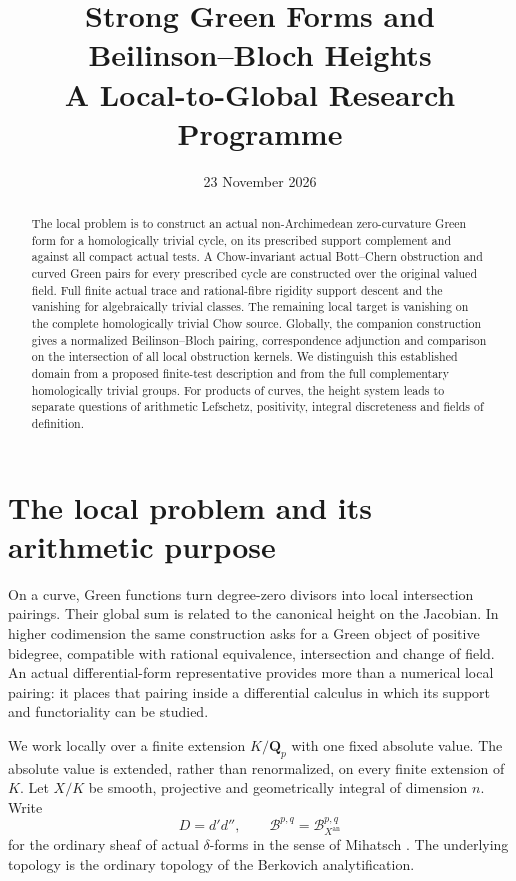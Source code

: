 \documentclass[11pt]{article}
\title{Strong Green Forms and Beilinson--Bloch Heights\\A Local-to-Global Research Programme}
\author{}
\date{23 November 2026}
\theoremstyle{definition}
\numberwithin{equation}{section}
\newcommand{\an}{\mathrm{an}}
\newcommand{\B}{\mathcal B}
\newcommand{\Q}{\mathbf Q}
\begin{document}
\maketitle
\begin{abstract}
The local problem is to construct an actual non-Archimedean zero-curvature Green form for a homologically trivial cycle, on its prescribed support complement and against all compact actual tests. A Chow-invariant actual Bott--Chern obstruction and curved Green pairs for every prescribed cycle are constructed over the original valued field. Full finite actual trace and rational-fibre rigidity support descent and the vanishing for algebraically trivial classes. The remaining local target is vanishing on the complete homologically trivial Chow source. Globally, the companion construction gives a normalized Beilinson--Bloch pairing, correspondence adjunction and comparison on the intersection of all local obstruction kernels. We distinguish this established domain from a proposed finite-test description and from the full complementary homologically trivial groups. For products of curves, the height system leads to separate questions of arithmetic Lefschetz, positivity, integral discreteness and fields of definition.
\end{abstract}

\tableofcontents

\section{The local problem and its arithmetic purpose}\label{sec:purpose}

On a curve, Green functions turn degree-zero divisors into local intersection pairings. Their global sum is related to the canonical height on the Jacobian. In higher codimension the same construction asks for a Green object of positive bidegree, compatible with rational equivalence, intersection and change of field. An actual differential-form representative provides more than a numerical local pairing: it places that pairing inside a differential calculus in which its support and functoriality can be studied.

We work locally over a finite extension $K/\Q_p$ with one fixed absolute value. The absolute value is extended, rather than renormalized, on every finite extension of $K$. Let $X/K$ be smooth, projective and geometrically integral of dimension $n$. Write
\[
 D=d'd'',\qquad \B^{p,q}=\B^{p,q}_{X^{\an}}
\]
for the ordinary sheaf of actual $\delta$-forms in the sense of Mihatsch \cite{M}. The underlying topology is the ordinary topology of the Berkovich analytification.
\end{document}
